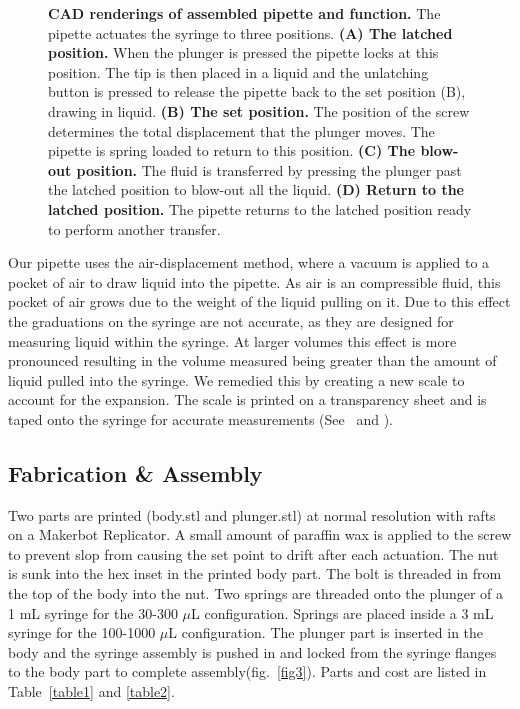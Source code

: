 \documentclass[10pt,letterpaper]{article}
\begin{document}
\begin{figure}
	\caption{
		{\bf CAD renderings of assembled pipette and function.} The pipette actuates the syringe to three positions. {\bf (A) The latched position.} When the plunger is pressed the pipette locks at this position. The tip is then placed in a liquid and the unlatching button is pressed to release the pipette back to the set position (B), drawing in liquid.  {\bf(B) The set position.} The position of the screw determines the total displacement that the plunger moves. The pipette is spring loaded to return to this position. {\bf (C) The blow-out position.} The fluid is transferred by pressing the plunger past the latched position to blow-out all the liquid. {\bf (D) Return to the latched position.} The pipette returns to the latched position ready to perform another transfer.
	}
	\label{fig2}
\end{figure}

Our pipette uses the air-displacement method, where a vacuum is applied to a pocket of air to draw liquid into the pipette.
As air is an compressible fluid, this pocket of air grows due to the weight of the liquid pulling on it.
Due to this effect the graduations on the syringe are not accurate, as they are designed for measuring liquid within the syringe.
At larger volumes this effect is more pronounced resulting in the volume measured being greater than the amount of liquid pulled into the syringe.
We remedied this by creating a new scale to account for the expansion.
The scale is printed on a transparency sheet and is taped onto the syringe for accurate measurements (See~ and ).

\subsection*{Fabrication \& Assembly}
Two parts are printed (body.stl and plunger.stl) at normal resolution with rafts on a Makerbot Replicator.
A small amount of paraffin wax is applied to the screw to prevent slop from causing the set point to drift after each actuation.
The nut is sunk into the hex inset in the printed body part.
The bolt is threaded in from the top of the body into the nut.
Two springs are threaded onto the plunger of a 1 mL syringe for the 30-300 $\mu$L configuration.
Springs are placed inside a 3 mL syringe for the 100-1000 $\mu$L configuration.
The plunger part is inserted in the body and the syringe assembly is pushed in and locked from the syringe flanges to the body part to complete assembly(fig.~\ref{fig3}).
Parts and cost are listed in Table~\ref{table1} and \ref{table2}.
\end{document}
